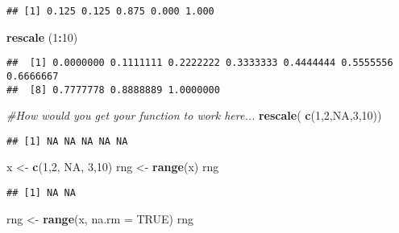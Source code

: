 \documentclass[
]{article}
\newenvironment{Shaded}{\begin{snugshade}}{\end{snugshade}}
\newcommand{\CommentTok}[1]{\textcolor[rgb]{0.56,0.35,0.01}{\textit{#1}}}
\newcommand{\DataTypeTok}[1]{\textcolor[rgb]{0.13,0.29,0.53}{#1}}
\newcommand{\DecValTok}[1]{\textcolor[rgb]{0.00,0.00,0.81}{#1}}
\newcommand{\KeywordTok}[1]{\textcolor[rgb]{0.13,0.29,0.53}{\textbf{#1}}}
\newcommand{\NormalTok}[1]{#1}
\newcommand{\OperatorTok}[1]{\textcolor[rgb]{0.81,0.36,0.00}{\textbf{#1}}}
\newcommand{\OtherTok}[1]{\textcolor[rgb]{0.56,0.35,0.01}{#1}}
\newcommand{\StringTok}[1]{\textcolor[rgb]{0.31,0.60,0.02}{#1}}
\begin{document}
\begin{verbatim}
## [1] 0.125 0.125 0.875 0.000 1.000
\end{verbatim}

\begin{Shaded}
\begin{Highlighting}[]
\KeywordTok{rescale}\NormalTok{ (}\DecValTok{1}\OperatorTok{:}\DecValTok{10}\NormalTok{)}
\end{Highlighting}
\end{Shaded}

\begin{verbatim}
##  [1] 0.0000000 0.1111111 0.2222222 0.3333333 0.4444444 0.5555556 0.6666667
##  [8] 0.7777778 0.8888889 1.0000000
\end{verbatim}

\begin{Shaded}
\begin{Highlighting}[]
\CommentTok{#How would you get your function to work here...}
\KeywordTok{rescale}\NormalTok{( }\KeywordTok{c}\NormalTok{(}\DecValTok{1}\NormalTok{,}\DecValTok{2}\NormalTok{,}\OtherTok{NA}\NormalTok{,}\DecValTok{3}\NormalTok{,}\DecValTok{10}\NormalTok{))}
\end{Highlighting}
\end{Shaded}

\begin{verbatim}
## [1] NA NA NA NA NA
\end{verbatim}

\begin{Shaded}
\begin{Highlighting}[]
\NormalTok{x <-}\StringTok{ }\KeywordTok{c}\NormalTok{(}\DecValTok{1}\NormalTok{,}\DecValTok{2}\NormalTok{, }\OtherTok{NA}\NormalTok{, }\DecValTok{3}\NormalTok{,}\DecValTok{10}\NormalTok{)}
\NormalTok{rng <-}\StringTok{ }\KeywordTok{range}\NormalTok{(x)}
\NormalTok{rng}
\end{Highlighting}
\end{Shaded}

\begin{verbatim}
## [1] NA NA
\end{verbatim}

\begin{Shaded}
\begin{Highlighting}[]
\NormalTok{rng <-}\StringTok{ }\KeywordTok{range}\NormalTok{(x, }\DataTypeTok{na.rm =} \OtherTok{TRUE}\NormalTok{)}
\NormalTok{rng}
\end{Highlighting}
\end{Shaded}
\end{document}
